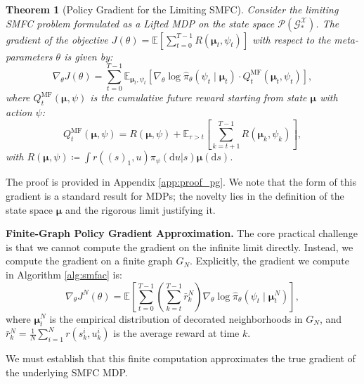 \documentclass{article}
\newtheorem{theorem}{Theorem}
\begin{document}
\begin{theorem}[Policy Gradient for the Limiting SMFC]
\label{thm:policy-gradient}
Consider the limiting SMFC problem formulated as a Lifted MDP on the state space $\mathcal{P}(\mathcal{G}_*^{\mathcal{X}})$. The gradient of the objective $J(\theta) = \mathbb{E}[\sum_{t=0}^{T-1} R(\boldsymbol{\mu}_t, \psi_t)]$ with respect to the meta-parameters $\theta$ is given by:
\begin{equation}
    \nabla_\theta J(\theta) = \sum_{t=0}^{T-1} \mathbb{E}_{\boldsymbol{\mu}_t, \psi_t} \left[ \nabla_\theta \log \hat{\pi}_\theta(\psi_t \mid \boldsymbol{\mu}_t) \cdot Q^{\text{MF}}_t(\boldsymbol{\mu}_t, \psi_t) \right],
\end{equation}
where $Q^{\text{MF}}_t(\boldsymbol{\mu}, \psi)$ is the cumulative future reward starting from state $\boldsymbol{\mu}$ with action $\psi$:
\begin{equation}
    Q^{\text{MF}}_t(\boldsymbol{\mu}, \psi) = R(\boldsymbol{\mu}, \psi) + \mathbb{E}_{\tau > t} \left[ \sum_{k=t+1}^{T-1} R(\boldsymbol{\mu}_k, \psi_k) \right],
\end{equation}
with $R(\boldsymbol{\mu}, \psi) \coloneqq \int r((s)_1, u) \pi_\psi(\mathrm du|s) \boldsymbol{\mu}(\mathrm ds)$.
\end{theorem}

The proof is provided in Appendix \ref{app:proof_pg}. We note that the form of this gradient is a standard result for MDPs; the novelty lies in the definition of the state space $\boldsymbol{\mu}$ and the rigorous limit justifying it.

\noindent\textbf{Finite-Graph Policy Gradient Approximation.}
The core practical challenge is that we cannot compute the gradient on the infinite limit directly. Instead, we compute the gradient on a finite graph $G_N$. Explicitly, the gradient we compute in Algorithm \ref{alg:smfac} is:
\begin{equation}
    \label{eq:finite_grad}
    \nabla_\theta J^N(\theta) = \mathbb{E} \left[ \sum_{t=0}^{T-1} \left( \sum_{k=t}^{T-1} \bar{r}^N_k \right) \nabla_\theta \log \hat{\pi}_\theta(\psi_t \mid \boldsymbol{\mu}^N_t) \right],
\end{equation}
where $\boldsymbol{\mu}^N_t$ is the empirical distribution of decorated neighborhoods in $G_N$, and $\bar{r}^N_k = \frac{1}{N} \sum_{i=1}^N r(s^i_k, u^i_k)$ is the average reward at time $k$.

We must establish that this finite computation approximates the true gradient of the underlying SMFC MDP.
\end{document}
